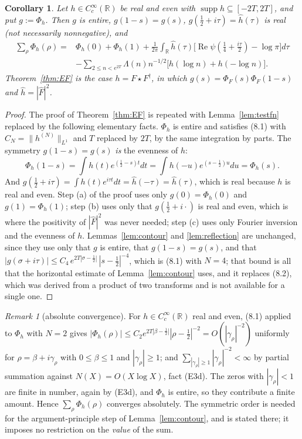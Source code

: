 \documentclass[11pt]{amsart}
\newtheorem{corollary}[theorem]{Corollary}
\theoremstyle{definition}
\theoremstyle{remark}
\newtheorem{remark}[theorem]{Remark}
\newcommand{\R}{\mathbb R}
\newcommand{\Rel}{\operatorname{Re}}
\newcommand{\supp}{\operatorname{supp}}
\begin{document}
\begin{corollary}
\label{cor:EFeven}
Let $h\in C_c^\infty(\R)$ be real and even with $\supp h\subseteq[-2T,2T]$, and
put $g:=\Phi_h$.  Then $g$ is entire, $g(1-s)=g(s)$, $g(\tfrac12+i\tau)=\hat
h(\tau)$ is real (not necessarily nonnegative), and
\begin{equation}
\begin{aligned}
  \sum_\rho\Phi_h(\rho)={}&\Phi_h(0)+\Phi_h(1)
   +\frac1{2\pi}\int_\R\hat h(\tau)
     \bigl[\Rel\psi(\tfrac14+\tfrac{i\tau}2)-\log\pi\bigr]d\tau\\
   &-\sum_{2\le n<e^{2T}}\Lambda(n)n^{-1/2}\bigl[h(\log n)+h(-\log n)\bigr].
\end{aligned}
\tag{8.12}
\end{equation}
Theorem~\emph{\ref{thm:EF}} is the case $h=F\star F^\dagger$, in which
$g(s)=\Phi_F(s)\Phi_F(1-s)$ and $\hat h=|\hat F|^2$.
\end{corollary}

\begin{proof}
The proof of Theorem~\ref{thm:EF} is repeated with
Lemma~\ref{lem:testfn} replaced by the following elementary facts.  $\Phi_h$ is
entire and satisfies (8.1) with $C_N=\|h^{(N)}\|_{L^1}$ and $T$ replaced by
$2T$, by the same integration by parts.  The symmetry $g(1-s)=g(s)$ \emph{is}
the evenness of $h$:
\[
  \Phi_h(1-s)=\int h(t)e^{(\frac12-s)t}dt=\int h(-u)e^{(s-\frac12)u}du
  =\Phi_h(s).
\]
And $g(\tfrac12+i\tau)=\int h(t)e^{i\tau t}dt=\hat h(-\tau)=\hat h(\tau)$,
which is real because $h$ is real and even.  Step (a) of the proof uses only
$g(0)=\Phi_h(0)$ and $g(1)=\Phi_h(1)$; step (b) uses only that
$g(\tfrac12+i\cdot)$ is real and even, which is where the positivity of
$|\hat F|^2$ was never needed; step (c) uses only Fourier inversion and the
evenness of $h$.  Lemmas~\ref{lem:contour} and \ref{lem:reflection} are
unchanged, since they use only that $g$ is entire, that $g(1-s)=g(s)$, and that
$|g(\sigma+i\tau)|\le C_4\,e^{2T|\sigma-\frac12|}\,|s-\tfrac12|^{-4}$, which is
(8.1) with $N=4$; that bound is all that the horizontal estimate of
Lemma~\ref{lem:contour} uses, and it replaces (8.2), which was derived from a
product of two transforms and is not available for a single one.
\end{proof}

\begin{remark}[absolute convergence]
\label{rem:abs}
For $h\in C_c^\infty(\R)$ real and even, (8.1) applied to $\Phi_h$ with $N=2$
gives $|\Phi_h(\rho)|\le C_2e^{2T|\beta-\frac12|}|\rho-\tfrac12|^{-2}
=O(|\gamma_\rho|^{-2})$ uniformly for $\rho=\beta+i\gamma_\rho$ with
$0\le\beta\le1$ and $|\gamma_\rho|\ge1$; and
$\sum_{|\gamma_\rho|\ge1}|\gamma_\rho|^{-2}<\infty$ by partial summation
against $N(X)=O(X\log X)$, fact (E3d).  The zeros with $|\gamma_\rho|<1$ are
finite in number, again by (E3d), and $\Phi_h$ is entire, so they contribute a
finite amount.  Hence $\sum_\rho\Phi_h(\rho)$ converges absolutely.  The
symmetric order is needed for the
argument-principle step of Lemma~\ref{lem:contour}, and is stated there; it
imposes no restriction on the \emph{value} of the sum.
\end{remark}
\end{document}
